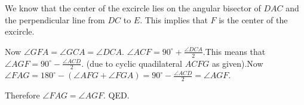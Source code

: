 \begin{enumerate}
 We know that the center of the excircle lies on the angular bisector of $DAC$ and the perpendicular line from $DC$ to $E$. This implies that $F$ is the center of the excircle. 

 Now $\angle GFA=\angle GCA=\angle DCA$. $\angle ACF=90^\circ+\frac{\angle DCA}{2}$.This means that $\angle AGF=90^\circ-\frac{\angle ACD}{2}$. (due to cyclic quadilateral $ACFG$ as given).Now $\angle FAG =180^\circ- (\angle AFG + \angle FGA)=90^\circ-\frac{\angle ACD}{2}=\angle AGF$.

 Therefore $\angle FAG=\angle AGF$. QED.

 


\end{enumerate}